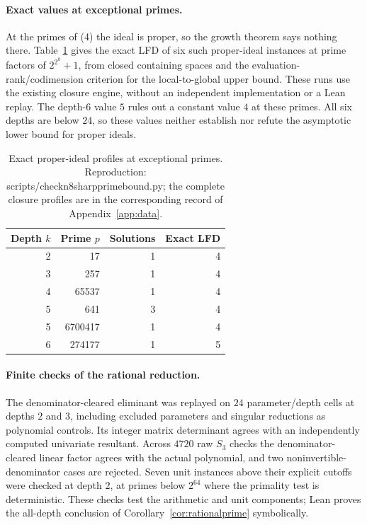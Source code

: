 \documentclass[11pt]{article}
\theoremstyle{definition}\newtheorem{definition}[theorem]{Definition}
\theoremstyle{remark}\newtheorem{remark}[theorem]{Remark}
\newcommand{\codeus}{\textunderscore\allowbreak}
\newcommand{\code}[1]{{\ttfamily\let\_\codeus#1}}
\begin{document}
\paragraph{Exact values at exceptional primes.}
At the primes of (4) the ideal is proper, so the growth theorem says
nothing there. Table~\ref{tab:fermatlfd} gives the exact LFD of six such
proper-ideal instances at prime factors of $2^{2^k}+1$, from closed
containing spaces and the evaluation-rank/codimension criterion for the
local-to-global upper bound. These runs use the existing closure engine,
without an independent implementation or a Lean replay. The depth-$6$ value
$5$ rules out a constant value $4$ at these primes. All six depths are
below $24$, so these values neither establish nor refute the asymptotic
lower bound for proper ideals.
\begin{table}[htbp]\centering\small
\begin{tabular}{rrrr}
\toprule
Depth $k$ & Prime $p$ & Solutions & Exact LFD\\
\midrule
2 & 17 & 1 & 4\\
3 & 257 & 1 & 4\\
4 & 65537 & 1 & 4\\
5 & 641 & 3 & 4\\
5 & 6700417 & 1 & 4\\
6 & 274177 & 1 & 5\\
\bottomrule
\end{tabular}
\caption{Exact proper-ideal profiles at exceptional primes. Reproduction:
\code{scripts/check\_n8\_sharp\_prime\_bound.py}; the complete closure
profiles are in the corresponding record of Appendix~\ref{app:data}.}
\label{tab:fermatlfd}
\end{table}
\FloatBarrier

\paragraph{Finite checks of the rational reduction.}
The denominator-cleared eliminant was replayed on $24$ parameter/depth
cells at depths $2$ and $3$, including excluded parameters and singular
reductions as polynomial controls. Its integer matrix determinant agrees
with an independently computed univariate resultant. Across $4720$ raw
$S_3$ checks the denominator-cleared linear factor agrees with the actual
polynomial, and two noninvertible-denominator cases are rejected. Seven unit
instances above their explicit cutoffs were checked at depth $2$, at primes
below $2^{64}$ where the primality test is deterministic. These checks test
the arithmetic and unit components; Lean proves the all-depth conclusion of
Corollary~\ref{cor:rationalprime} symbolically.
\end{document}
